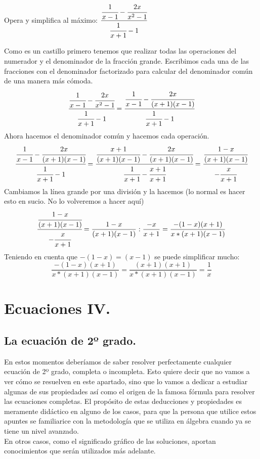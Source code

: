 \documentclass[a4paper,11pt,answers]{exam}
\begin{document}
\begin{questions}
\begin{solution}
    \end{solution}
  \question Opera y simplifica al máximo: $\cfrac{\cfrac{1}{x-1} - \cfrac{2x}{x^2 -1}}{
      \cfrac{1}{x+1}-1}$
    \begin{solution}
      Como es un castillo primero tenemos que realizar todas las operaciones del numerador y el
      denominador de la fracción grande. Escribimos cada una de las fracciones con el denominador
      factorizado para calcular del denominador común de una manera más cómoda.
      \[\cfrac{\cfrac{1}{x-1} - \cfrac{2x}{x^2 -1}}{\cfrac{1}{x+1}-1} =
        \cfrac{\cfrac{1}{x-1} - \cfrac{2x}{(x+1)(x-1)}}{\cfrac{1}{x+1}-1}\]
      Ahora hacemos el denominador común y hacemos cada operación.
      \[\cfrac{\cfrac{1}{x-1} - \cfrac{2x}{(x+1)(x-1)}}{\cfrac{1}{x+1}-1} =
        \cfrac{\cfrac{x+1}{(x+1)(x-1)} - \cfrac{2x}{(x+1)(x-1)}}{\cfrac{1}{x+1}-\cfrac{x+1}{x+1}} =
        \cfrac{\cfrac{1-x}{(x+1)(x-1)}}{-\cfrac{x}{x+1}}\]
      Cambiamos la línea grande por una división y la hacemos (lo normal es hacer esto en sucio.
      No lo volveremos a hacer aquí)
      \[\cfrac{\cfrac{1-x}{(x+1)(x-1)}}{-\cfrac{x}{x+1}} =
        \frac{1-x}{(x+1)(x-1)}: \frac{-x}{x+1} = \frac{-(1-x)(x+1)}{x*(x+1)(x-1)}\]
      Teniendo en cuenta que $-(1-x) = (x-1)$ se puede simplificar mucho:
      \[\frac{-(1-x)(x+1)}{x*(x+1)(x-1)} = \frac{(x+1)(x+1)}{x*(x+1)(x-1)} = \frac{1}{x}\]
    \end{solution}
\end{questions}

\section{Ecuaciones IV.}
\subsection{La ecuación de 2º grado.}
En estos momentos deberíamos de saber resolver perfectamente cualquier ecuación de 2º grado, completa o incompleta. Esto quiere decir que no vamos a ver cómo se resuelven en este apartado, sino que lo vamos a dedicar a estudiar algunas de sus propiedades así como el origen de la famosa fórmula para resolver las ecuaciones completas. El propósito de estas deducciones y propiedades es meramente didáctico en alguno de los casos, para que la persona que utilice estos apuntes se familiarice con la metodología que se utiliza en álgebra cuando ya se tiene un nivel avanzado.\\
En otros casos, como el significado gráfico de las soluciones, aportan conocimientos que serán utilizados más adelante.
\end{document}
